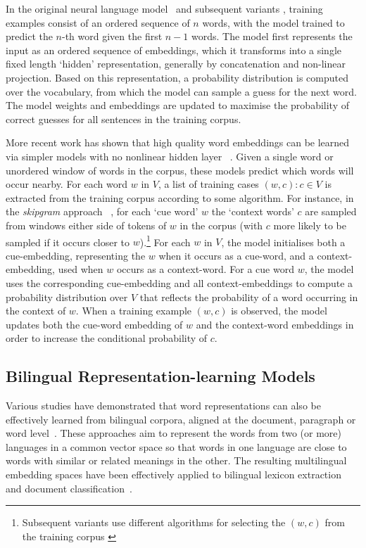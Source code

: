 In the original neural language model~\cite{Bengio2003lm} and subsequent
variants \cite{collobert2008unified}, training examples consist of an ordered sequence of $n$ words,
with the model trained to predict the $n$-th word given the first $n-1$
words. The model first represents the input as an ordered sequence of embeddings,
which it transforms into a single fixed length `hidden' representation, generally by concatenation and non-linear projection.
Based on this representation, a probability distribution is
computed over the vocabulary, from which the model can sample a guess for the
next word. The model weights and embeddings are updated to maximise the
probability of correct guesses for all sentences in the
training corpus. 
 
More recent work has shown that high quality word embeddings can be learned via simpler models
with no nonlinear hidden layer ~\cite{mikolov2013distributed,Pennington2014}. Given a single word or unordered window of words in the corpus, these models predict which words will occur nearby. For each word \( w\) in \(V\), a list of training cases \({(w,c) : c \in V }\) is extracted from the training corpus according to some algorithm.  For instance, in the \emph{skipgram}
approach ~\cite{mikolov2013distributed}, for each `cue word' \(w\) the `context words' \(c\) are sampled
from windows either side of tokens of \(w\) in the corpus (with \(c\) more
likely to be sampled if it occurs closer to \(w\)).\footnote{
    Subsequent variants use different algorithms for selecting the
    \((w,c)\) from the training corpus \cite{Hill2014EMNLP,levy2014dependency}
} For each \(w\) in \( V\), the model initialises both a
cue-embedding, representing the \(w\) when it occurs as a cue-word, and a
context-embedding, used when \(w\) occurs as a context-word. For a cue word
\(w\), the model uses the corresponding cue-embedding and all
context-embeddings to compute a probability distribution over \(V\) that
reflects the probability of a word occurring in the context of \(w\). When a
training example \((w,c)\) is observed, the model updates both the cue-word
embedding of \(w\) and the context-word embeddings in order to increase the
conditional probability of \(c\). 

\subsection{Bilingual Representation-learning Models}
Various studies have demonstrated that word representations can also be effectively learned from bilingual corpora, aligned at the document, paragraph or word level~\cite{Haghighi2008Learning,vulic2011identifying,mikolov2013exploiting,Hermann:2014:ICLR,lauly2014autoencoder}. These approaches aim to represent the words from two (or more) languages in a common vector space so that words in one language are close to words with similar or related meanings in the other. The resulting multilingual embedding spaces have been effectively applied to bilingual lexicon extraction~\cite{Haghighi2008Learning,vulic2011identifying,mikolov2013exploiting} and document classification~\cite{Klementiev,Hermann:2014:ICLR,lauly2014autoencoder,Kocisky:2014}.

